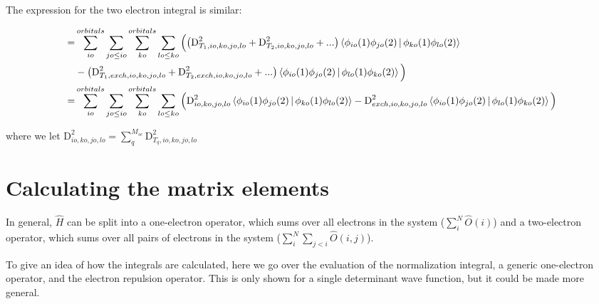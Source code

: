 \documentclass[a4paper]{article}
\begin{document}
The expression for the two electron integral is similar:


\begin{equation}
 \begin{aligned}
         =& \sum_{io}^{orbitals}\sum_{jo\leq io}\sum_{ko}^{orbitals}\sum_{lo\leq ko}                                                                                                                                                
     \Big( \big(\text{D}_{T_1, io,ko,jo,lo}^2 + \text{D}_{T_2, io,ko,jo,lo}^2 +...\big) \Braket{ \phi_{io}(1) \phi_{jo}(2) | \phi_{ko}(1) \phi_{lo}(2) }        \\                                                                                                                                       
    &-  \big(\text{D}_{T_1,exch, io,ko,jo,lo}^2+\text{D}_{T_2,exch, io,ko,jo,lo}^2+...\big)\Braket{ \phi_{io}(1) \phi_{jo}(2) | \phi_{lo}(1) \phi_{ko}(2) } \Big) \\
    =&  \sum_{io}^{orbitals}\sum_{jo\leq io}\sum_{ko}^{orbitals}\sum_{lo\leq ko}                                                                                                                                                
    \Big(\text{D}_{io,ko,jo,lo}^2\Braket{ \phi_{io}(1) \phi_{jo}(2) | \phi_{ko}(1) \phi_{lo}(2) }    -  \text{D}_{exch,io,ko,jo,lo}^2\Braket{ \phi_{io}(1) \phi_{jo}(2) | \phi_{lo}(1) \phi_{ko}(2) } \Big)
    \label{total_twoe}
    \end{aligned}
     \end{equation}


where we let $\displaystyle \text{D}_{io,ko,jo,lo}^2 = \sum_q^{M_{sc}} \text{D}_{T_q, io,ko,jo,lo}^2$

\section{Calculating the matrix elements} 

In general, $\hat{H}$ can be split into a one-electron operator, which sums over all electrons in the system ($\displaystyle \sum_i^N\hat{O}(i)$) and a two-electron operator, which sums over all pairs of electrons in the system
($ \displaystyle  \sum_i^N  \sum_{j<i} \hat{O}(i,j)$). 

To give an idea of how the integrals are calculated, here we go over the evaluation of the normalization integral, a generic one-electron operator, and the electron repulsion operator. This is only shown for a single determinant wave function, but it could be made more general.
\end{document}
